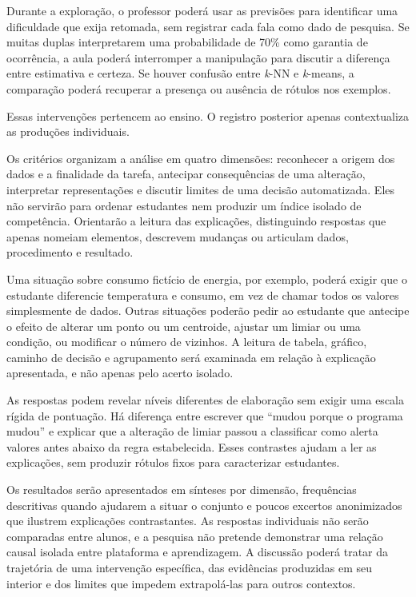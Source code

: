 Durante a exploração, o professor poderá usar as previsões para identificar uma dificuldade que exija retomada, sem registrar cada fala como dado de pesquisa. Se muitas duplas interpretarem uma probabilidade de 70\% como garantia de ocorrência, a aula poderá interromper a manipulação para discutir a diferença entre estimativa e certeza. Se houver confusão entre \textit{k}-NN e \textit{k}-means, a comparação poderá recuperar a presença ou ausência de rótulos nos exemplos.

Essas intervenções pertencem ao ensino. O registro posterior apenas contextualiza as produções individuais.

Os critérios organizam a análise em quatro dimensões: reconhecer a origem dos dados e a finalidade da tarefa, antecipar consequências de uma alteração, interpretar representações e discutir limites de uma decisão automatizada. Eles não servirão para ordenar estudantes nem produzir um índice isolado de competência. Orientarão a leitura das explicações, distinguindo respostas que apenas nomeiam elementos, descrevem mudanças ou articulam dados, procedimento e resultado.

Uma situação sobre consumo fictício de energia, por exemplo, poderá exigir que o estudante diferencie temperatura e consumo, em vez de chamar todos os valores simplesmente de dados. Outras situações poderão pedir ao estudante que antecipe o efeito de alterar um ponto ou um centroide, ajustar um limiar ou uma condição, ou modificar o número de vizinhos. A leitura de tabela, gráfico, caminho de decisão e agrupamento será examinada em relação à explicação apresentada, e não apenas pelo acerto isolado.

As respostas podem revelar níveis diferentes de elaboração sem exigir uma escala rígida de pontuação. Há diferença entre escrever que ``mudou porque o programa mudou'' e explicar que a alteração de limiar passou a classificar como alerta valores antes abaixo da regra estabelecida. Esses contrastes ajudam a ler as explicações, sem produzir rótulos fixos para caracterizar estudantes.

Os resultados serão apresentados em sínteses por dimensão, frequências descritivas quando ajudarem a situar o conjunto e poucos excertos anonimizados que ilustrem explicações contrastantes. As respostas individuais não serão comparadas entre alunos, e a pesquisa não pretende demonstrar uma relação causal isolada entre plataforma e aprendizagem. A discussão poderá tratar da trajetória de uma intervenção específica, das evidências produzidas em seu interior e dos limites que impedem extrapolá-las para outros contextos.

